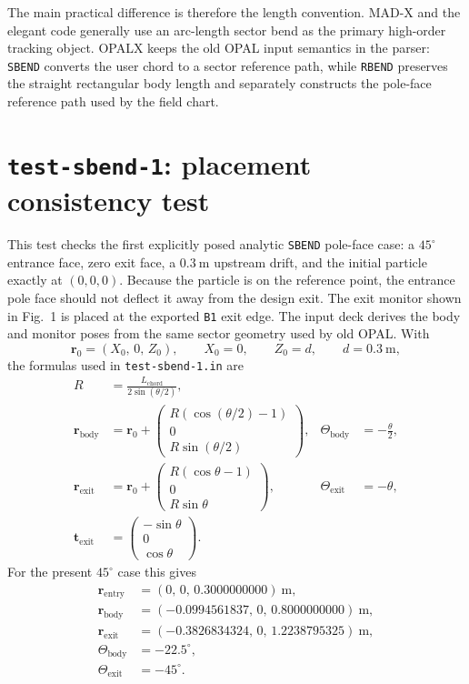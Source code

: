 \documentclass[11pt]{article}
\newcommand{\degree}{^\circ}
\newcommand{\code}[1]{\texttt{#1}}
\newcommand{\vect}[1]{\boldsymbol{#1}}
\begin{document}
The main practical difference is therefore the length convention.  MAD-X and
the elegant code generally use an arc-length sector bend as the primary
high-order tracking object.  OPALX keeps the old OPAL input semantics in the parser:
\code{SBEND} converts the user chord to a sector reference path, while
\code{RBEND} preserves the straight rectangular body length and separately
constructs the pole-face reference path used by the field chart.

\section{\code{test-sbend-1}: placement consistency test}

This test checks the first explicitly posed analytic \code{SBEND} pole-face
case: a \(45\degree\) entrance face, zero exit face, a \(0.3\ \mathrm{m}\)
upstream drift, and the initial particle exactly at \((0,0,0)\).
Because the particle is on the reference point, the entrance pole face should
not deflect it away from the design exit.  The exit monitor shown in Fig.~1 is
placed at the exported \code{B1} exit edge.  The input deck derives the body
and monitor poses from the same sector geometry used by old OPAL.  With
\[
  \vect r_0 = (X_0,\,0,\,Z_0), \qquad X_0=0,\qquad Z_0=d,
  \qquad d=0.3\ \mathrm{m},
\]
the formulas used in \code{test-sbend-1.in} are
\[
\begin{aligned}
  R &= \frac{L_\mathrm{chord}}{2\sin(\theta/2)},\\
  \vect r_\mathrm{body}
    &= \vect r_0 +
       \begin{pmatrix}
         R\left(\cos(\theta/2)-1\right)\\
         0\\
         R\sin(\theta/2)
       \end{pmatrix},
  &
  \Theta_\mathrm{body} &= -\frac{\theta}{2},\\[1.0ex]
  \vect r_\mathrm{exit}
    &= \vect r_0 +
       \begin{pmatrix}
         R\left(\cos\theta-1\right)\\
         0\\
         R\sin\theta
       \end{pmatrix},
  &
  \Theta_\mathrm{exit} &= -\theta,\\[1.0ex]
  \vect t_\mathrm{exit}
    &= \begin{pmatrix}-\sin\theta\\0\\\cos\theta\end{pmatrix}.
\end{aligned}
\]
For the present \(45\degree\) case this gives
\[
\begin{aligned}
  \vect r_\mathrm{entry}
    &= (0,\,0,\,0.3000000000)\ \mathrm{m},\\
  \vect r_\mathrm{body}
    &= (-0.0994561837,\,0,\,0.8000000000)\ \mathrm{m},\\
  \vect r_\mathrm{exit}
    &= (-0.3826834324,\,0,\,1.2238795325)\ \mathrm{m},\\
  \Theta_\mathrm{body}
    &= -22.5\degree,\\
  \Theta_\mathrm{exit}
    &= -45\degree .
\end{aligned}
\]
\end{document}
